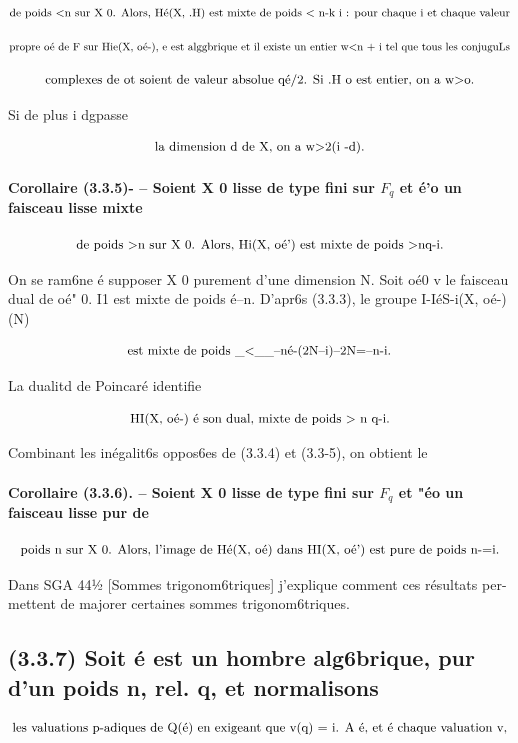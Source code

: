 \documentclass[11pt]{article}
\theoremstyle{remark}
\begin{document}
\[\text{\small de poids <n sur X 0. Alors, Hé(X, .H) est mixte de poids < n-k i : pour chaque i et chaque valeur}\]

\[\text{\small propre oé de F sur Hie(X, oé-), e est alggbrique et il existe un entier w<n + i tel que tous les conjuguLs}\]

\[\text{\small complexes de ot soient de valeur absolue qé/2. Si .H o est entier, on a w>o.}\]

Si de plus i dgpasse

\[\text{\small la dimension d de X, on a w>2(i -d).}\]

\paragraph{Corollaire (3.3.5)- -- Soient X 0 lisse de type fini sur \(F_q\) et é'o un faisceau lisse mixte}

\[\text{\small de poids >n sur X 0. Alors, Hi(X, oé') est mixte de poids >nq-i.}\]

On se ram6ne é supposer X 0 purement d'une dimension N. Soit oé0 v le faisceau dual de oé" 0. I1 est mixte de poids é--n. D'apr6s (3.3.3), le groupe I-IéS-i(X, oé-)(N)

\[\text{\small est mixte de poids \_<\_\_--né-(2N--i)--2N=--n-i.}\]

La dualitd de Poincaré identifie

\[\text{\small HI(X, oé-) é son dual, mixte de poids > n q-i.}\]

Combinant les inégalit6s oppos6es de (3.3.4) et (3.3-5), on obtient le

\paragraph{Corollaire (3.3.6). -- Soient X 0 lisse de type fini sur \(F_q\) et "éo un faisceau lisse pur de}

\[\text{\small poids n sur X 0. Alors, l'image de Hé(X, oé) dans HI(X, oé') est pure de poids n-=i.}\]

Dans SGA 44½ [Sommes trigonom6triques] j'explique comment ces résultats per- mettent de majorer certaines sommes trigonom6triques.

\subsection*{(3.3.7) Soit é est un hombre alg6brique, pur d'un poids n, rel. q, et normalisons}

\[\text{\small les valuations p-adiques de Q(é) en exigeant que v(q) = i. A é, et é chaque valuation v,}\]
\end{document}
